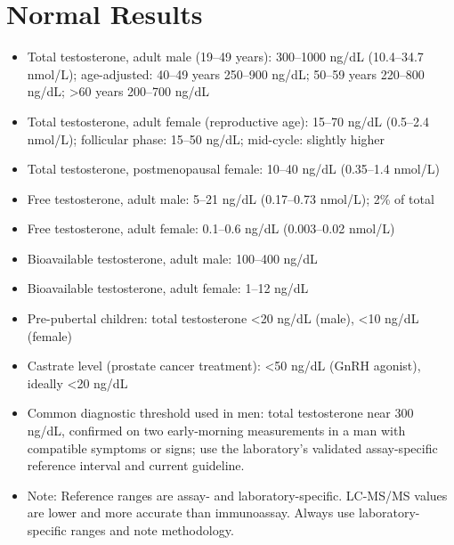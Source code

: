 \section*{Normal Results}
\begin{itemize}
  \item Total testosterone, adult male (19--49 years): 300--1000 ng/dL (10.4--34.7 nmol/L); age-adjusted: 40--49 years 250--900 ng/dL; 50--59 years 220--800 ng/dL; >60 years 200--700 ng/dL
  \item Total testosterone, adult female (reproductive age): 15--70 ng/dL (0.5--2.4 nmol/L); follicular phase: 15--50 ng/dL; mid-cycle: slightly higher
  \item Total testosterone, postmenopausal female: 10--40 ng/dL (0.35--1.4 nmol/L)
  \item Free testosterone, adult male: 5--21 ng/dL (0.17--0.73 nmol/L); 2\% of total
  \item Free testosterone, adult female: 0.1--0.6 ng/dL (0.003--0.02 nmol/L)
  \item Bioavailable testosterone, adult male: 100--400 ng/dL
  \item Bioavailable testosterone, adult female: 1--12 ng/dL
  \item Pre-pubertal children: total testosterone <20 ng/dL (male), <10 ng/dL (female)
  \item Castrate level (prostate cancer treatment): <50 ng/dL (GnRH agonist), ideally <20 ng/dL
  \item Common diagnostic threshold used in men: total testosterone near 300 ng/dL, confirmed on two early-morning measurements in a man with compatible symptoms or signs; use the laboratory's validated assay-specific reference interval and current guideline.
  \item Note: Reference ranges are assay- and laboratory-specific. LC-MS/MS values are lower and more accurate than immunoassay. Always use laboratory-specific ranges and note methodology.
\end{itemize}

